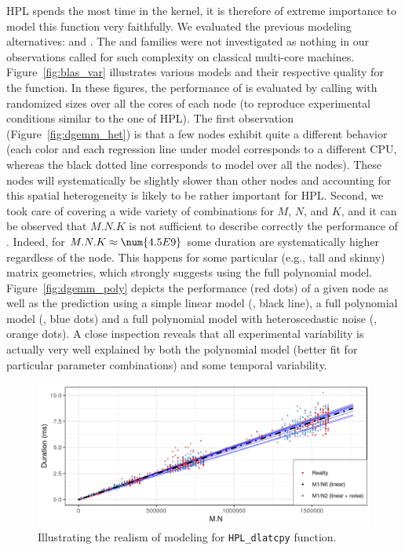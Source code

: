             HPL spends the most time in the \dgemm kernel, it is therefore of extreme importance to model this
            function very faithfully.  We  evaluated the previous modeling alternatives:
             and .  The \modelp{} and \noisep{}
            families were not investigated as nothing in our observations called for such complexity on classical
            multi-core machines.  Figure~\ref{fig:blas_var} illustrates various models and their respective quality for
            the \dgemm function. In these figures, the performance of \dgemm is evaluated by calling
            \dgemm with randomized sizes over all the cores of each node (to reproduce experimental conditions
            similar to the one of HPL). The first observation (Figure~\ref{fig:dgemm_het}) is that a few nodes exhibit
            quite a different behavior (each color and each regression line under model  corresponds to a
            different CPU, whereas the black dotted line corresponds to model  over all the nodes). These nodes
            will systematically be slightly slower than other nodes and accounting for this spatial heterogeneity is
            likely to be rather important for HPL.  Second, we took care of covering a wide variety of combinations for
            \(M\), \(N\), and \(K\), and it can be observed that \(M.N.K\) is not sufficient to describe correctly the
            performance of \dgemm. Indeed, for \(M.N.K \approx \num{4.5E9}\) some duration are systematically
            higher regardless of the node. This happens for some particular (e.g., tall and skinny) matrix geometries,
            which strongly suggests using the full polynomial model. Figure~\ref{fig:dgemm_poly} depicts the performance
            (red dots) of a given node as well as the prediction using a simple linear model (, black line),
            a full polynomial model (, blue dots) and a full polynomial model with heteroscedastic noise
            (, orange dots). A close inspection reveals that all experimental variability is
            actually very well explained by both the polynomial model (better fit for particular parameter combinations)
            and some temporal variability.

            \begin{figure}[htb]
                \centering
                \includegraphics[width=\linewidth]{img/prediction/modeling/kernels/dlatcpy_model.png}
                \caption{Illustrating the realism of modeling for \texttt{HPL\_dlatcpy} function.}
                \label{fig:HPL_var}
            \end{figure}

